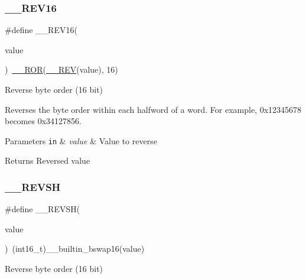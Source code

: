 \subsubsection{\texorpdfstring{\+\_\+\+\_\+\+R\+E\+V16}{\_\_REV16}}
{\footnotesize\ttfamily \#define \+\_\+\+\_\+\+R\+E\+V16(\begin{DoxyParamCaption}\item[{}]{value }\end{DoxyParamCaption})~\mbox{\hyperlink{cmsis__iccarm_8h_a7105032649bf6158d4d2d5dc38a3f94c}{\+\_\+\+\_\+\+R\+OR}}(\mbox{\hyperlink{group___c_m_s_i_s___core___instruction_interface_gadb92679719950635fba8b1b954072695}{\+\_\+\+\_\+\+R\+EV}}(value), 16)}



Reverse byte order (16 bit) 

Reverses the byte order within each halfword of a word. For example, 0x12345678 becomes 0x34127856. 
\begin{DoxyParams}[1]{Parameters}
\mbox{\tt in}  & {\em value} & Value to reverse \\
\hline
\end{DoxyParams}
\begin{DoxyReturn}{Returns}
Reversed value 
\end{DoxyReturn}
\mbox{\label{group___c_m_s_i_s___core___instruction_interface_gae580812686119c9c5cf3c11a7519a404}} 
\subsubsection{\texorpdfstring{\+\_\+\+\_\+\+R\+E\+V\+SH}{\_\_REVSH}}
{\footnotesize\ttfamily \#define \+\_\+\+\_\+\+R\+E\+V\+SH(\begin{DoxyParamCaption}\item[{}]{value }\end{DoxyParamCaption})~(int16\+\_\+t)\+\_\+\+\_\+builtin\+\_\+bswap16(value)}



Reverse byte order (16 bit) 

